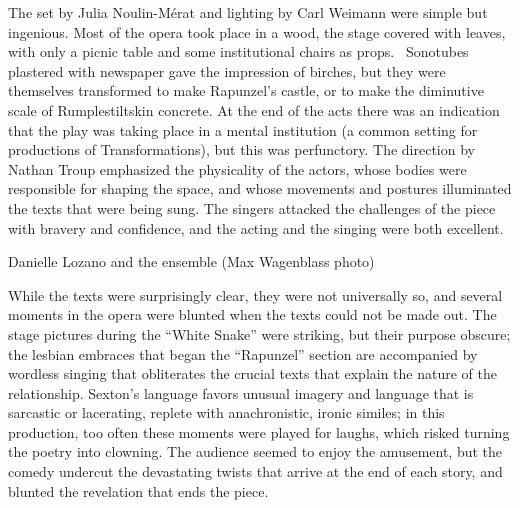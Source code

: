 The set by Julia Noulin-Mérat and lighting by Carl Weimann were simple but ingenious. Most of the opera took place in a wood, the stage covered with leaves, with only a picnic table and some institutional chairs as props.  Sonotubes plastered with newspaper gave the impression of birches, but they were themselves transformed to make Rapunzel’s castle, or to make the diminutive scale of Rumplestiltskin concrete. At the end of the acts there was an indication that the play was taking place in a mental institution (a common setting for productions of Transformations), but this was perfunctory. The direction by Nathan Troup emphasized the physicality of the actors, whose bodies were responsible for shaping the space, and whose movements and postures illuminated the texts that were being sung. The singers attacked the challenges of the piece with bravery and confidence, and the acting and the singing were both excellent.

Danielle Lozano and the ensemble (Max Wagenblass photo)

While the texts were surprisingly clear, they were not universally so, and several moments in the opera were blunted when the texts could not be made out. The stage pictures during the “White Snake” were striking, but their purpose obscure; the lesbian embraces that began the “Rapunzel” section are accompanied by wordless singing that obliterates the crucial texts that explain the nature of the relationship. Sexton’s language favors unusual imagery and language that is sarcastic or lacerating, replete with anachronistic, ironic similes; in this production, too often these moments were played for laughs, which risked turning the poetry into clowning. The audience seemed to enjoy the amusement, but the comedy undercut the devastating twists that arrive at the end of each story, and blunted the revelation that ends the piece.
